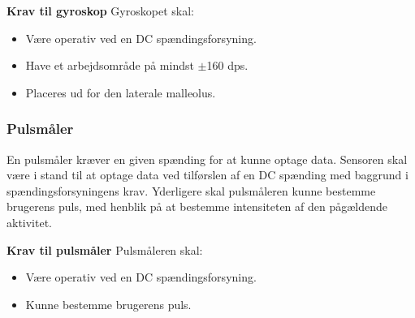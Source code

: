 \textbf{Krav til gyroskop} \newline
Gyroskopet skal:
\begin{itemize}
\item Være operativ ved en DC spændingsforsyning.
\item Have et arbejdsområde på mindst $\pm$160 dps.
\item Placeres ud for den laterale malleolus.
\end{itemize}

\subsubsection{Pulsmåler}
En pulsmåler kræver en given spænding for at kunne optage data. Sensoren skal være i stand til at optage data ved tilførslen af en DC spænding med baggrund i spændingsforsyningens krav. Yderligere skal pulsmåleren kunne bestemme brugerens puls, med henblik på at bestemme intensiteten af den pågældende aktivitet.

\textbf{Krav til pulsmåler} \newline
Pulsmåleren skal:
\begin{itemize}
\item Være operativ ved en DC spændingsforsyning.
\item Kunne bestemme brugerens puls.
\end{itemize}
%
